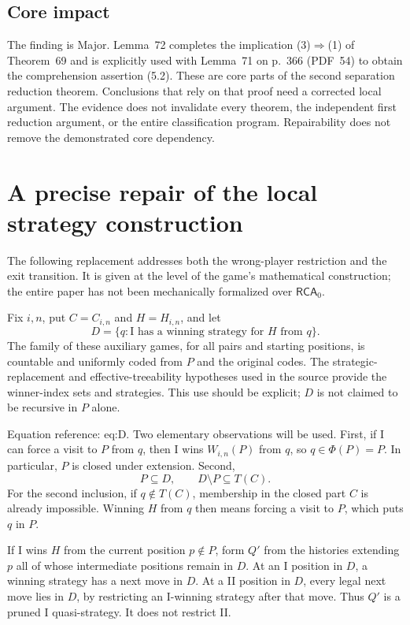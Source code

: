 \documentclass[10pt]{article}
\begin{document}
\subsection*{Core impact}
The finding is Major. Lemma 72 completes the implication (3)\(\Rightarrow\)(1) of Theorem 69 and is explicitly used with Lemma 71 on p. 366 (PDF 54) to obtain the comprehension assertion (5.2). These are core parts of the second separation reduction theorem. Conclusions that rely on that proof need a corrected local argument. The evidence does not invalidate every theorem, the independent first reduction argument, or the entire classification program. Repairability does not remove the demonstrated core dependency.\par
\section*{A precise repair of the local strategy construction}
The following replacement addresses both the wrong-player restriction and the exit transition. It is given at the level of the game’s mathematical construction; the entire paper has not been mechanically formalized over \(\mathsf{RCA}_0\).\par
Fix \(i,n\), put \(C=C_{i,n}\) and \(H=H_{i,n}\), and let \[D=\{q:\text{I has a winning strategy for }H\text{ from }q\}.\] The family of these auxiliary games, for all pairs and starting positions, is countable and uniformly coded from \(P\) and the original codes. The strategic-replacement and effective-treeability hypotheses used in the source provide the winner-index sets and strategies. This use should be explicit; \(D\) is not claimed to be recursive in \(P\) alone.\par
Equation reference: eq:D. Two elementary observations will be used. First, if I can force a visit to \(P\) from \(q\), then I wins \(W_{i,n}(P)\) from \(q\), so \(q\in\Phi(P)=P\). In particular, \(P\) is closed under extension. Second, \[
 P\subseteq D,\qquad D\setminus P\subseteq T(C).\] For the second inclusion, if \(q\notin T(C)\), membership in the closed part \(C\) is already impossible. Winning \(H\) from \(q\) then means forcing a visit to \(P\), which puts \(q\) in \(P\).\par
If I wins \(H\) from the current position \(p\notin P\), form \(Q'\) from the histories extending \(p\) all of whose intermediate positions remain in \(D\). At an I position in \(D\), a winning strategy has a next move in \(D\). At a II position in \(D\), every legal next move lies in \(D\), by restricting an I-winning strategy after that move. Thus \(Q'\) is a pruned I quasi-strategy. It does not restrict II.\par
\end{document}
